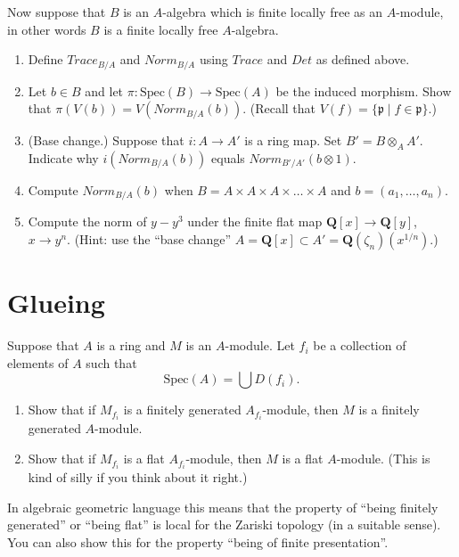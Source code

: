 \begin{exercise}
\label{exercise-trace-det-rings}
Now suppose that $B$ is an $A$-algebra which is finite
locally free as an $A$-module, in other words $B$ is a finite locally
free $A$-algebra.
\begin{enumerate}
\item Define $Trace_{B/A}$ and $Norm_{B/A}$ using
$Trace$ and $Det$ as defined above.
\item Let $b\in B$ and let $\pi : \text{Spec}(B) \to \text{Spec}(A)$ be
the induced morphism. Show that $\pi(V(b)) = V(Norm_{B/A}(b))$.
(Recall that $V(f) = \{ {\mathfrak p} \mid f \in {\mathfrak p}\}$.)
\item (Base change.) Suppose that $i : A \to A'$ is a ring map. Set
$B' = B\otimes_A A'$. Indicate why $i(Norm_{B/A}(b))$ equals
$Norm_{B'/A'}(b\otimes 1)$.
\item Compute $Norm_{B/A}(b)$ when
$B = A\times A\times A \times\ldots\times A$
and $b = (a_1, \ldots, a_n)$.
\item Compute the norm of $y-y^3$ under the finite flat
map ${\mathbf Q}[x] \to {\mathbf Q}[y]$, $x \to y^n$. (Hint: use
the ``base change''
$A = {\mathbf Q}[x] \subset A' = {\mathbf Q}(\zeta_n)(x^{1/n})$.)
\end{enumerate}
\end{exercise}



\section{Glueing}
\label{section-glueing}

\begin{exercise}
\label{exercise-cover}
Suppose that $A$ is a ring and $M$ is an $A$-module.
Let $f_i$ be a collection of elements of $A$ such that
$$
\text{Spec}(A) = \bigcup D(f_i).
$$
\begin{enumerate}
\item Show that if $M_{f_i}$ is a finitely generated $A_{f_i}$-module,
then $M$ is a finitely generated $A$-module.
\item Show that if $M_{f_i}$ is a flat $A_{f_i}$-module,
then $M$ is a flat $A$-module. (This is kind of silly if you think about
it right.)
\end{enumerate}
\end{exercise}

\begin{remark}
\label{remark-cover}
In algebraic geometric language this means that the property
of ``being finitely generated'' or ``being flat'' is local for the Zariski
topology (in a suitable sense). You can also show this for the property
``being of finite presentation''.
\end{remark}





